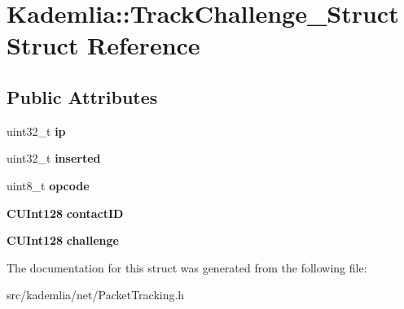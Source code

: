 \section{Kademlia::TrackChallenge\_\-Struct Struct Reference}
\label{structKademlia_1_1TrackChallenge__Struct}
\subsection*{Public Attributes}
\begin{DoxyCompactItemize}
\item 
uint32\_\-t {\bfseries ip}\label{structKademlia_1_1TrackChallenge__Struct_aa5ee7721206b6ddb86cc3ac39f340da9}

\item 
uint32\_\-t {\bfseries inserted}\label{structKademlia_1_1TrackChallenge__Struct_a01685cfb70592ab4ad45018a68ca13be}

\item 
uint8\_\-t {\bfseries opcode}\label{structKademlia_1_1TrackChallenge__Struct_a0e695eee0e49b8e84eb69ea4ef25e31d}

\item 
{\bf CUInt128} {\bfseries contactID}\label{structKademlia_1_1TrackChallenge__Struct_acc8b25f22d323c7c3592263773ad9e27}

\item 
{\bf CUInt128} {\bfseries challenge}\label{structKademlia_1_1TrackChallenge__Struct_a21068e185509ede6a92b9b522e88b170}

\end{DoxyCompactItemize}


The documentation for this struct was generated from the following file:\begin{DoxyCompactItemize}
\item 
src/kademlia/net/PacketTracking.h\end{DoxyCompactItemize}
